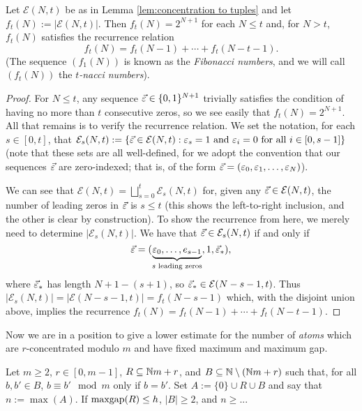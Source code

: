 \begin{lemma} \label{lem:counting tuples}
Let $\mathcal{E}(N,t)$ be as in Lemma \ref{lem:concentration to tuples} and let $f_t(N):= |\mathcal{E}(N,t)|$.
Then $f_t(N) = 2^{N+1}$ for each $N\le t$ and, for $N> t$, $f_t(N)$ satisfies the recurrence relation
\[ f_t(N) = f_t(N-1) + \cdots + f_t(N-t-1). \]
(The sequence $(f_1(N))$ is known as the \textit{Fibonacci numbers}, and we will call $(f_t(N))$ the \textit{$t$-nacci numbers}).
\end{lemma}
\begin{proof}
For $N\le t$, any sequence $\vec{\varepsilon}\in \{0,1\}^{N+1}$ trivially satisfies the condition of having no more than $t$ consecutive zeros, so we see easily that $f_t(N) = 2^{N+1}$.  
All that remains is to verify the recurrence relation.  
We set the notation, for each $s \in [0,t]$, that $\mathcal{E}_s(N,t) := \{\vec{\varepsilon}\in \mathcal{E}(N,t): \varepsilon_s = 1 \textrm{ and } \varepsilon_i = 0 \textrm{ for all $i\in [0,s-1]$} \}$ (note that these sets are all well-defined, for we adopt the convention that our sequences $\vec{\varepsilon}$ are zero-indexed; that is, of the form $\vec{\varepsilon} = (\varepsilon_0,\varepsilon_1,\dots, \varepsilon_N)$).

We can see that $\mathcal{E}(N,t) = \bigsqcup_{s=0}^t \mathcal{E}_s(N,t)$ for, given any $\vec{\varepsilon}\in \mathcal{E}(N,t)$, the number of leading zeros in $\vec{\varepsilon}$ is $s\le t$ (this shows the left-to-right inclusion, and the other is clear by construction).
To show the recurrence from here, we merely need to determine $|\mathcal{E}_s(N,t)|$.
We have that $\vec{\varepsilon}\in \mathcal{E}_s(N,t)$ if and only if 
\[\vec{\varepsilon} = (\underbrace{\varepsilon_0,\dots,e_{s-1}}_{s \textrm{ leading zeros}}, 1, \vec{\varepsilon}_*),\]
 where $\vec{\varepsilon}_*$ has length $N+1 - (s+1)$, so $\vec{\varepsilon}_*\in \mathcal{E}(N-s-1,t)$.
 Thus $|\mathcal{E}_s(N,t)| = |\mathcal{E}(N-s-1,t)|=f_t(N-s-1)$ which, with the disjoint union above, implies the recurrence $f_t(N) = f_t(N-1) + \cdots + f_t(N-t-1)$.
\end{proof}

Now we are in a position to give a lower estimate for the number of \textit{atoms} which are $r$-concentrated modulo $m$ and have fixed maximum and maximum gap.  

\begin{lemma} \label{lem:counting concentrated atoms}
Let $m\ge 2$, $r\in [0,m-1]$, $R\subseteq \mathbb{N} m + r$, and $B \subseteq \mathbb{N} \setminus (\mathbb{N} m + r)$ such that, for all $b,b'\in B$, $b\equiv b' \mod m$ only if $b=b'$.
Set $A := \{0\}\cup R \cup B$ and say that $n:=\max(A)$.
If $\operatorname{maxgap}(R) \le h$, $|B|\ge 2$, and $n\ge ...$
\end{lemma}